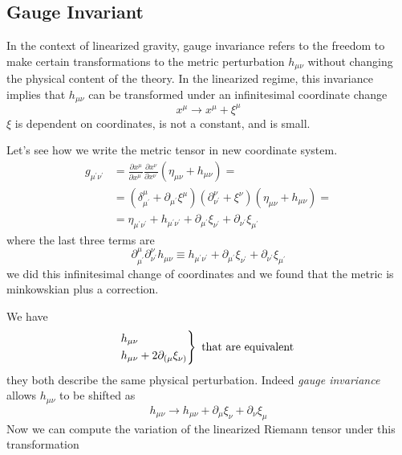 \subsection{Gauge Invariant}
In the context of linearized gravity, gauge invariance refers to the freedom to make certain transformations to the metric perturbation $h_{\mu \nu }$ without changing the physical content of the theory. In the linearized regime, this invariance implies that $h_{\mu \nu }$ can be transformed under an infinitesimal coordinate change
\[
x^{\mu } \to x^{\mu }+ \xi^{\mu }  
\]
$\xi $ is dependent on coordinates, is not a constant, and is small.\par
Let's see how we write the metric tensor in new coordinate system.
\begin{align}
	g_{\mu ^{\prime }\nu ^{\prime }} &= \frac{\partial x^{\mu }}{\partial x^{\mu ^{\prime }}} \frac{\partial x^{\nu }}{\partial x^{\nu ^{\prime }}} \left( \eta _{\mu \nu } +h_{\mu \nu } \right) = \nonumber\\
					 &= \left( \delta ^{\mu }_{\mu ^{\prime }} + \partial_{\mu ^{\prime }}\xi ^{\mu } \right)\left( \partial^{\nu }_{\nu ^{\prime }}+\xi ^{\nu } \right)\left( \eta _{\mu \nu }+h_{\mu \nu } \right) = \nonumber\\
	&= \eta _{\mu ^{\prime }\nu ^{\prime }} + h_{\mu ^{\prime }\nu ^{\prime }} +\partial_{\mu ^{\prime }}\xi _{\nu ^{\prime }}+\partial_{\nu ^{\prime }}\xi _{\mu ^{\prime }}
\end{align}
where the last three terms are
\begin{equation}
\partial^{\mu }_{\mu ^{\prime }}\partial^{\nu }_{\nu ^{\prime }}h_{\mu \nu } \equiv   h_{\mu ^{\prime }\nu ^{\prime }} +\partial_{\mu ^{\prime }}\xi _{\nu ^{\prime }}+\partial_{\nu ^{\prime }}\xi _{\mu ^{\prime }}
\end{equation}
we did this infinitesimal change of coordinates and we found that the metric is minkowskian plus a correction.\par
We have
\[
\begin{rcases*}
h_{\mu \nu }\\
h_{\mu \nu }+ 2\partial_{(\mu  }\xi _{\nu )}
\end{rcases*}
\text{ that are equivalent }
\]
they both describe the same physical perturbation. Indeed \emph{gauge invariance} allows $h_{\mu \nu } $ to be shifted as
\[
h_{\mu \nu }\to h_{\mu \nu }+\partial_{\mu }\xi _{\nu }+\partial_{\nu }\xi _{\mu }
\]
Now we can compute the variation of the linearized Riemann tensor under this transformation
